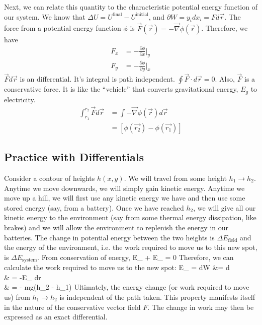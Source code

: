 \documentclass[12pt]{article}
\begin{document}
Next, we can relate this quantity to the characteristic potential energy function of our system.  We know that $\Delta U = U^\text{final} - U^\text{initial}$, and $\partial W = y_i dx_i = F d\vec{r}$.  The force from a potential energy function $\phi$ is $\vec{F}(\vec{r}) = -\vec{\nabla}\phi(\vec{r})$.  Therefore, we have
\begin{align*}
F_x &= -\frac{\partial \phi}{\partial x}|_y \\
F_y &= -\frac{\partial \phi}{\partial y}|_x
\end{align*}
$\vec{F}d\vec{r}$ is an  differential.  It's integral is path independent.  $\oint \vec{F} \cdot d\vec{r} = 0$.  Also, $\vec{F}$ is a conservative force.  It is like the ``vehicle'' that converts gravitational energy, $E_g$ to electricity.
\begin{align*}
\int_{r_1}^{r_2} \vec{F} d\vec{r} &= \int - \vec{\nabla} \phi(\vec{r})d\vec{r}\\
&= [\phi(\vec{r_2}) - \phi(\vec{r_1})]
\end{align*}

\subsection{Practice with Differentials}
Consider a contour of heights $h(x,y)$.  We will travel from some height $h_1 \rightarrow h_2$.  Anytime we move downwards, we will simply gain kinetic energy.  Anytime we move up a hill, we will first use any kinetic energy we have and then use some stored energy (say, from a battery).  Once we have reached $h_2$, we will give all our kinetic energy to the environment (say from some thermal energy dissipation, like brakes) and we will allow the environment to replenish the energy in our batteries.  The change in potential energy between the two heights is $\Delta E_\text{field}$ and the energy of the environment, i.e. the work required to move us to this new spot, is $\Delta E_\text{system}$.  From conservation of energy,
\eqs
\Delta E_ + \Delta E_ = 0
\eqe
Therefore, we can calculate the work required to move us to the new spot:
\eqs
\Delta E_ = dW &= \int {} \cdot d\\
& = -\int \nabla E_ \cdot dr\\
& = - mg(h_2 - h_1)
\eqe
Ultimately, the energy change (or work required to move us) from $h_1 \rightarrow h_2$ is independent of the path taken.  This property manifests itself in the nature of the conservative vector field $F$.  The change in work may then be expressed as an exact differential.
\end{document}
